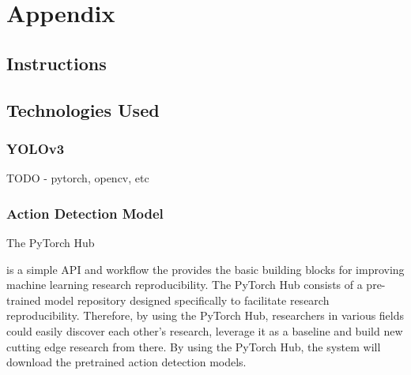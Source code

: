 \documentclass{article}
\begin{document}
\newpage

\section{Appendix}

\subsection{Instructions}

\subsection{Technologies Used}

\subsubsection{YOLOv3}

TODO - pytorch, opencv, etc

\subsubsection{Action Detection Model}

\hypertarget{actionDetection_used}{The PyTorch Hub} is a simple API and workflow the provides the basic building blocks for improving machine learning research reproducibility. The PyTorch Hub consists of a pre-trained model repository designed specifically to facilitate research reproducibility.  Therefore, by using the PyTorch Hub, researchers in various fields could easily discover each other’s research, leverage it as a baseline and build new cutting edge research from there. By using the PyTorch Hub, the system will download the pretrained action detection models.
\end{document}
